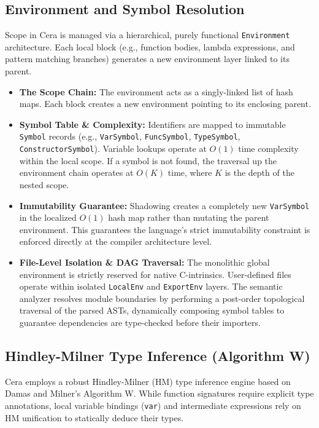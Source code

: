 \documentclass[11pt, a4paper]{article}
\begin{document}
\subsection{Environment and Symbol Resolution}
Scope in Cera is managed via a hierarchical, purely functional \texttt{Environment} architecture. Each local block (e.g., function bodies, lambda expressions, and pattern matching branches) generates a new environment layer linked to its parent. 
\begin{itemize}
    \item \textbf{The Scope Chain:} The environment acts as a singly-linked list of hash maps. Each block creates a new environment pointing to its enclosing parent.
    \item \textbf{Symbol Table \& Complexity:} Identifiers are mapped to immutable \texttt{Symbol} records (e.g., \texttt{VarSymbol}, \texttt{FuncSymbol}, \texttt{TypeSymbol}, \texttt{ConstructorSymbol}). Variable lookups operate at $O(1)$ time complexity within the local scope. If a symbol is not found, the traversal up the environment chain operates at $O(K)$ time, where $K$ is the depth of the nested scope.
    \item \textbf{Immutability Guarantee:} Shadowing creates a completely new \texttt{VarSymbol} in the localized $O(1)$ hash map rather than mutating the parent environment. This guarantees the language's strict immutability constraint is enforced directly at the compiler architecture level.
    \item \textbf{File-Level Isolation \& DAG Traversal:} The monolithic global environment is strictly reserved for native C-intrinsics. User-defined files operate within isolated \texttt{LocalEnv} and \texttt{ExportEnv} layers. The semantic analyzer resolves module boundaries by performing a post-order topological traversal of the parsed ASTs, dynamically composing symbol tables to guarantee dependencies are type-checked before their importers.
\end{itemize}

\subsection{Hindley-Milner Type Inference (Algorithm W)}
Cera employs a robust Hindley-Milner (HM) type inference engine based on Damas and Milner's Algorithm W. While function signatures require explicit type annotations, local variable bindings (\texttt{var}) and intermediate expressions rely on HM unification to statically deduce their types.
\end{document}
